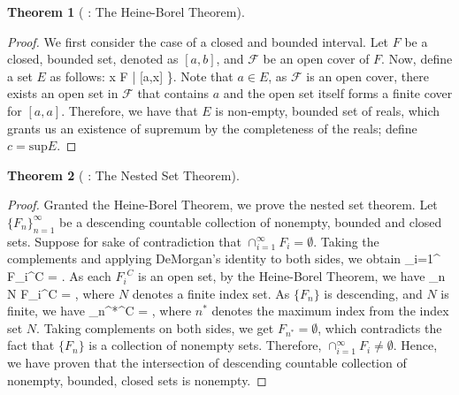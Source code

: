 \documentclass{article} %
\def\eQb#1\eQe{\begin{eqnarray*}#1\end{eqnarray*}}
\theoremstyle{quest}
\newtheorem*{theorem}{Theorem}
\begin{document}
\begin{theorem}[ : The Heine-Borel Theorem]
\end{theorem}
\begin{proof} We first consider the case of a closed and bounded interval. Let $F$ be
a closed, bounded set, denoted as $[a,b]$, and $\mathcal{F}$ be an open cover of $F$.
Now, define a set $E$ as follows:
\eQb
\{ x \in F | [a,x] \>  \>   \}.
\eQe
Note that $a \in E$, as $\mathcal{F}$ is an open cover, there exists an open set in 
$\mathcal{F}$ that
contains $a$ and the open set itself forms a finite cover for $[a,a]$. Therefore,
we have that $E$ is non-empty, bounded set of reals, which grants us an existence of supremum
by the completeness of the reals; define $c = \text{sup}E$.
\end{proof}

\bigskip

\begin{theorem}[ : The Nested Set Theorem]
\end{theorem}
\begin{proof} Granted the Heine-Borel Theorem, we prove the nested set theorem. Let
$\{ F_n \}_{n=1}^{\infty}$ be a descending countable collection of nonempty, bounded and closed sets.
Suppose for sake of contradiction that $\cap_{i=1}^{\infty} F_i = \emptyset$. 
Taking the complements and applying DeMorgan's identity
to both sides, we obtain
\eQb
\cup_{i=1}^{\infty} {F_i}^{C} = .
\eQe
As each ${F_i}^{C}$ is an open set, by the Heine-Borel Theorem, we have 
\eQb
\cup_{n \in N} {F_i}^{C} = ,
\eQe
where $N$ denotes a finite index set. As $\{ F_n \}$ is descending, and $N$ is finite,
we have
\eQb
F_{n^*}^{C} = ,
\eQe
where $n^*$ denotes the maximum index from the index set $N$. Taking complements on both sides,
we get $F_{n^*} = \emptyset$, which contradicts the fact that $\{ F_n \}$ is a collection of
nonempty sets. Therefore, $\cap_{i=1}^{\infty} {F_i} \neq \emptyset$.
Hence, we have proven that the intersection of descending countable collection 
of nonempty, bounded, closed sets is nonempty.
\end{proof}

\bigskip
\end{document}
